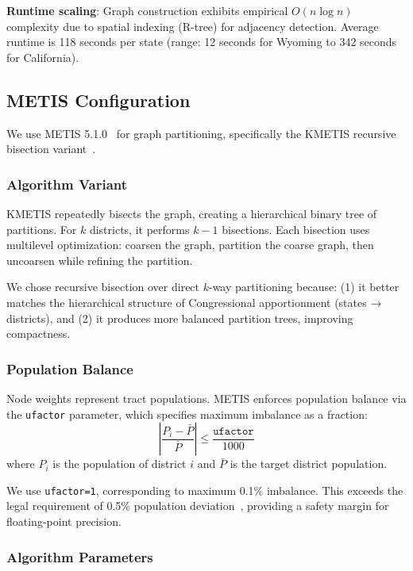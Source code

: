 \textbf{Runtime scaling}: Graph construction exhibits empirical $O(n \log n)$ complexity due to spatial indexing (R-tree) for adjacency detection. Average runtime is 118 seconds per state (range: 12 seconds for Wyoming to 342 seconds for California).

\subsection{METIS Configuration}
\label{sec:metis-configuration}

We use METIS 5.1.0~\cite{karypis1998} for graph partitioning, specifically the KMETIS recursive bisection variant~\cite{dellaLibera2026recursive}.

\subsubsection{Algorithm Variant}

KMETIS repeatedly bisects the graph, creating a hierarchical binary tree of partitions. For $k$ districts, it performs $k-1$ bisections. Each bisection uses multilevel optimization: coarsen the graph, partition the coarse graph, then uncoarsen while refining the partition.

We chose recursive bisection over direct $k$-way partitioning because: (1) it better matches the hierarchical structure of Congressional apportionment (states → districts), and (2) it produces more balanced partition trees, improving compactness.

\subsubsection{Population Balance}

Node weights represent tract populations. METIS enforces population balance via the \texttt{ufactor} parameter, which specifies maximum imbalance as a fraction:
\[
\left| \frac{P_i - \bar{P}}{\bar{P}} \right| \leq \frac{\texttt{ufactor}}{1000}
\]
where $P_i$ is the population of district $i$ and $\bar{P}$ is the target district population.

We use \texttt{ufactor=1}, corresponding to maximum 0.1\% imbalance. This exceeds the legal requirement of 0.5\% population deviation~\cite{karcher1983}, providing a safety margin for floating-point precision.

\subsubsection{Algorithm Parameters}

